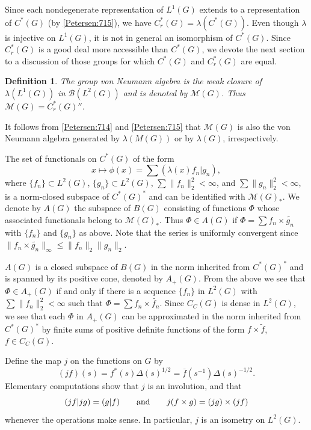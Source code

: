 \documentclass{book}
\newtheorem{definition}{Definition}[section]
\begin{document}
Since each nondegenerate representation of \(L^1(G)\)
extends to a representation of \(C^*(G)\) (by \ref{Petersen:715}), we have \(C^*_r(G) = \lambda(C^*(G))\).
Even though \(\lambda\) is injective on \(L^1(G)\), it is not in general an isomorphism of
\(C^*(G)\). Since \(C^*_r(G)\) is a good deal more accessible than \(C^*(G)\), we devote the
next section to a discussion of those groups for which \(C^*(G)\) and \(C^*_r(G)\) are
equal.
\begin{definition}
  The \textnormal{group von Neumann algebra} is the weak closure of \(\lambda(L^1(G))\) in
  \(\mathcal{B}(L^2(G))\) and is denoted by \(\mathcal{M}(G)\). Thus \(\mathcal{M}(G)=C^*_r(G)''\).
\end{definition}
It follows from \ref{Petersen:714} and \ref{Petersen:715} that \(\mathcal{M}(G)\) is also the von Neumann algebra
generated by \(\lambda(M(G))\) or by \(\lambda(G)\), irrespectively.\par
The set of functionals on \(C^*(G)\) of the form
\[
  x\mapsto\phi(x)=\sum(\lambda(x)f_n|g_n),
\]
where \(\{f_n\}\subset L^2(G)\), \(\{g_n\}\subset L^2(G)\), \(\sum\|f_n\|_2^2<\infty\), and \(\sum\|g_n\|_2^2<\infty\),
is a norm-closed subspace of \(C^*(G)^*\) and can be identified with \(\mathcal{M}(G)_*\).
We denote by \(A(G)\) the subspace of \(B(G)\) consisting of functions \(\Phi\) whose associated functionals belong to \(\mathcal{M}(G)_*\).
Thus \(\Phi\in A(G)\) if \(\Phi=\sum f_n\times\tilde{g_n}\) with \(\{f_n\}\) and \(\{g_n\}\) as above.
Note that the series is uniformly convergent since \(\|f_n\times\tilde{g_n}\|_\infty\leq\|f_n\|_2\|g_n\|_2\).\par
\(A(G)\) is a closed subspace of \(B(G)\) in the norm inherited from \(C^*(G)^*\) and is spanned by its positive cone, denoted by \(A_+(G)\).
From the above we see that \(\Phi\in A_+(G)\) if and only if there is a sequence \(\{f_n\}\) in \(L^2(G)\)
with \(\sum\|f_n\|_2^2<\infty\) such that \(\Phi=\sum f_n\times\tilde{f_n}\). Since \(C_C(G)\) is dense in \(L^2(G)\), we see that 
each \(\Phi\) in \(A_+(G)\) can be approximated in the norm inherited from \(C^*(G)^*\) by finite sums of positive definite
functions of the form \(f\times\tilde{f}\), \(f\in C_C(G)\).\label{Petersen:722}\par
Define the map \(j\) on the functions on \(G\) by
\[
  (jf)(s)=f^*(s)\Delta(s)^{1/2}=\overline{f}(s^{-1})\Delta(s)^{-1/2}.
\]
Elementary computations show that \(j\) is an involution, and that
\[
  (jf|jg)=(g|f)\qquad\textnormal{and}\qquad j(f\times g)=(jg)\times(jf)
\]
whenever the operations make sense. In particular, \(j\) is an isometry on \(L^2(G)\).\par
\end{document}
